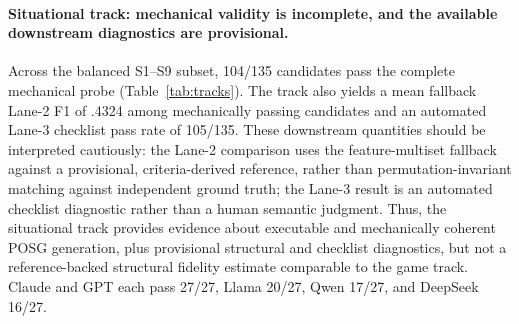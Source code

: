 \documentclass{article}
\begin{document}
  \paragraph{Situational track: mechanical validity is incomplete, and the
  available downstream diagnostics are provisional.}
  Across the balanced S1--S9 subset, 104/135 candidates pass the complete
  mechanical probe (Table~\ref{tab:tracks}). The track also yields a mean
  fallback Lane-2 F1 of .4324 among mechanically passing candidates and an
  automated Lane-3 checklist pass rate of 105/135. These downstream quantities
  should be interpreted cautiously: the Lane-2 comparison uses the
  feature-multiset fallback against a provisional, criteria-derived reference,
  rather than permutation-invariant matching against independent ground truth;
  the Lane-3 result is an automated checklist diagnostic rather than a human
  semantic judgment. Thus, the situational track provides evidence about
  executable and mechanically coherent POSG generation, plus provisional
  structural and checklist diagnostics, but not a reference-backed structural
  fidelity estimate comparable to the game track. Claude and GPT each pass 27/27, Llama 20/27, Qwen 17/27, and DeepSeek 16/27.
\end{document}
